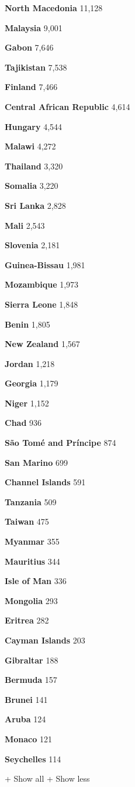 \textbf{North Macedonia} 11,128

\textbf{Malaysia} 9,001

\textbf{Gabon} 7,646

\textbf{Tajikistan} 7,538

\textbf{Finland} 7,466

\textbf{Central African Republic} 4,614

\textbf{Hungary} 4,544

\textbf{Malawi} 4,272

\textbf{Thailand} 3,320

\textbf{Somalia} 3,220

\textbf{Sri Lanka} 2,828

\textbf{Mali} 2,543

\textbf{Slovenia} 2,181

\textbf{Guinea-Bissau} 1,981

\textbf{Mozambique} 1,973

\textbf{Sierra Leone} 1,848

\textbf{Benin} 1,805

\textbf{New Zealand} 1,567

\textbf{Jordan} 1,218

\textbf{Georgia} 1,179

\textbf{Niger} 1,152

\textbf{Chad} 936

\textbf{São Tomé and Príncipe} 874

\textbf{San Marino} 699

\textbf{Channel Islands} 591

\textbf{Tanzania} 509

\textbf{Taiwan} 475

\textbf{Myanmar} 355

\textbf{Mauritius} 344

\textbf{Isle of Man} 336

\textbf{Mongolia} 293

\textbf{Eritrea} 282

\textbf{Cayman Islands} 203

\textbf{Gibraltar} 188

\textbf{Bermuda} 157

\textbf{Brunei} 141

\textbf{Aruba} 124

\textbf{Monaco} 121

\textbf{Seychelles} 114

+ Show all + Show less

